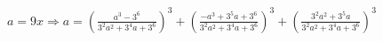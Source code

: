 \documentclass[preview]{standalone}
\begin{document}
\begin{center}
$a=9x\Rightarrow a=\left(\frac{a^3-3^6}{3^2a^2+3^4a+3^6}\right)^3+\left(\frac{-a^3+3^5a+3^6}{3^2a^2+3^4a+3^6}\right)^3+\left(\frac{3^2a^2+3^5a}{3^2a^2+3^4a+3^6}\right)^3$
\end{center}
\end{document}
